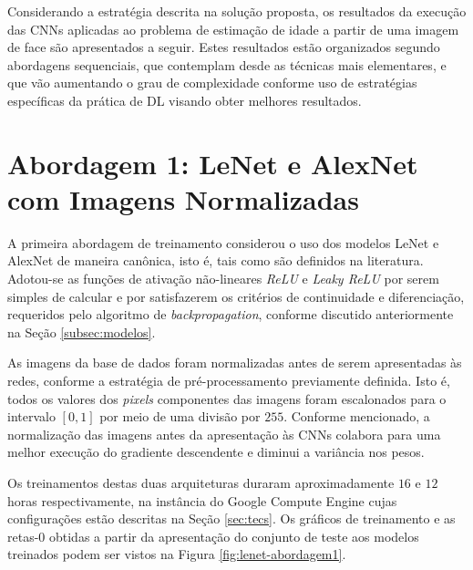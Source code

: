 
Considerando a estratégia descrita na solução proposta, os resultados da execução das CNNs aplicadas ao problema de estimação de idade a partir de uma imagem de face são apresentados a seguir. Estes resultados estão organizados segundo abordagens sequenciais, que contemplam desde as técnicas mais elementares, e que vão aumentando o grau de complexidade conforme uso de estratégias específicas da prática de DL visando obter melhores resultados.

\section{Abordagem 1: LeNet e AlexNet com Imagens Normalizadas}%

	A primeira abordagem de treinamento considerou o uso dos modelos LeNet e AlexNet de maneira canônica, isto é, tais como são definidos na literatura. Adotou-se as funções de ativação não-lineares \emph{ReLU} e \emph{Leaky ReLU} por serem simples de calcular e por satisfazerem os critérios de continuidade e diferenciação, requeridos pelo algoritmo de \emph{backpropagation}, conforme discutido anteriormente na Seção \ref{subsec:modelos}.

	As imagens da base de dados foram normalizadas antes de serem apresentadas às redes, conforme a estratégia de pré-processamento previamente definida. Isto é, todos os valores dos \emph{pixels} componentes das imagens foram escalonados para o intervalo $[0,1]$ por meio de uma divisão por $255$. Conforme mencionado, a normalização das imagens antes da apresentação às CNNs colabora para uma melhor execução do gradiente descendente e diminui a variância nos pesos.

	Os treinamentos destas duas arquiteturas duraram aproximadamente $16$ e $12$ horas respectivamente, na instância do Google Compute Engine cujas configurações estão descritas na Seção \ref{sec:tecs}. Os gráficos de treinamento e as retas-0 obtidas a partir da apresentação do conjunto de teste aos modelos treinados podem ser vistos na Figura \ref{fig:lenet-abordagem1}.


